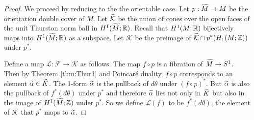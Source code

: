 \begin{proof}
  We proceed by reducing to the the orientable case. Let $p:\widetilde{M}\rightarrow M$ be the orientation double cover of $M$.  %
 Let $\widetilde{\mathcal{K}}$ be the union of cones over the open faces of the unit Thurston norm ball in $H^1(\widetilde{M};\mathbb{R})$. Recall that $H^1(M; \mathbb{R})$ bijectively maps into
  $H^1(\widetilde{M}; \mathbb{R})$ as a subspace. Let $\mathcal{K}$ be the preimage of $\mathcal{\widetilde{K}}\cap p^\ast(H_1(M;\mathbb{Z}))$ under $p^\ast$.  %

 Define a map $\mathcal{L}:\mathcal{F}\rightarrow \mathcal{K}$ as follows.  %
 The map $f\circ p$ is a fibration of $\widetilde{M}\to S^1$.  Then by Theorem \ref{thm:Thur1} and Poincar\'e duality, $f\circ p$ corresponds to an element $\widetilde{\alpha}\in \widetilde{K}$.  The 1-form $\widetilde{\alpha}$ is the pullback of $d\theta$ under $(f\circ p)^\ast$.  But $\widetilde{\alpha}$ is also the pullback of $f^\ast(d\theta)$ under $p^\ast$ and therefore $\widetilde{\alpha}$ lies not only in $\widetilde{K}$ but also in the image of $H^1(\widetilde{M};\mathbb{Z})$ under $p^\ast$.  So we define $\mathcal{L}(f)$ to be $f^\ast(d\theta)$, the element of $\mathcal{K}$ that $p^\ast$ maps to $\widetilde{\alpha}$.
  

\end{proof}
